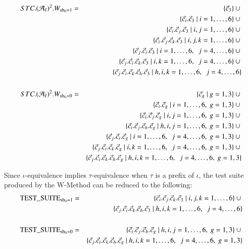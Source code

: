 \begin{eqnarray*}
STC.({\cal A}_I)^{2}.W_{\text{sb}_0=1}  & = & \{ \vec c_3\} \cup{}
\\ & & 
\{\vec c_i.\vec c_3~|~i=1,\dots,6\} \cup{}
\\ & &
\{\vec c_i.\vec c_j.\vec c_3~|~i,j=1,\dots,6\} \cup{}
\\ & &
\{\vec c_i.\vec c_j.\vec c_k.\vec c_3~|~i,j,k=1,\dots,6\} \cup{}
\\ & &
\{\vec c_j.\vec c_i.\vec c_3~|~i=1,\dots,6, \ \ j = 4,\dots,6 \} \cup{}
\\ & &
\{\vec c_j.\vec c_i.\vec c_k.\vec c_3~|~i,k=1,\dots,6, \ \ j = 4,\dots,6 \} \cup {}
\\ & & 
\{\vec c_j.\vec c_i.\vec c_k.\vec c_h.\vec c_3~|~h,i,k=1,\dots,6, \ \ j = 4,\dots,6 \}
\\ & & 
\\
STC.({\cal A}_I)^{2}.W_{\text{sb}_0=0}  & = & \{ \vec c_g~|~g=1,3 \}  \cup{}
\\ & & 
\{\vec c_i.\vec c_g~|~i=1,\dots,6,\ g=1,3\} \cup{}
\\ & &
\{\vec c_i.\vec c_j.\vec c_g~|~i,j=1,\dots,6,\ g=1,3\} \cup{}
\\ & &
\{\vec c_i.\vec c_j.\vec c_h.\vec c_g~|~h,i,j=1,\dots,6,\ g=1,3\} \cup{}
\\ & &
\{\vec c_j.\vec c_i.\vec c_g~|~i=1,\dots,6, \ \ j = 4,\dots,6,\ g=1,3 \} \cup{}
\\ & &
\{\vec c_j.\vec c_i.\vec c_k.\vec c_g~|~i,k=1,\dots,6, \ \ j = 4,\dots,6,\ g=1,3 \} \cup {}
\\ & &
\{\vec c_j.\vec c_i.\vec c_k.\vec c_h.\vec c_g~|~h,i,k=1,\dots,6, \ \ j = 4,\dots,6,\ g=1,3 \}
\end{eqnarray*}

Since $\iota$-equivalence implies $\tau$-equivalence when $\tau$ is a prefix of $\iota$, the test suite produced by the W-Method can be reduced to the following:
\begin{eqnarray*}
\text{TEST\_SUITE}_{\text{sb}_0=1} & = & 
\{\vec c_i.\vec c_j.\vec c_k.\vec c_3~|~i,j,k=1,\dots,6\} \cup{}
\\ & &
\{\vec c_j.\vec c_i.\vec c_k.\vec c_h.\vec c_3~|~h,i,k=1,\dots,6, \ \ j = 4,\dots,6 \}
\\ & & 
\\
\text{TEST\_SUITE}_{\text{sb}_0=0} & = & \{\vec c_i.\vec c_j.\vec c_h.\vec c_g~|~h,i,j=1,\dots,6,\ g=1,3\} \cup{}
\\ & &
\{\vec c_j.\vec c_i.\vec c_k.\vec c_h.\vec c_g~|~h,i,k=1,\dots,6, \ \ j = 4,\dots,6,\ g=1,3 \}
\end{eqnarray*}






